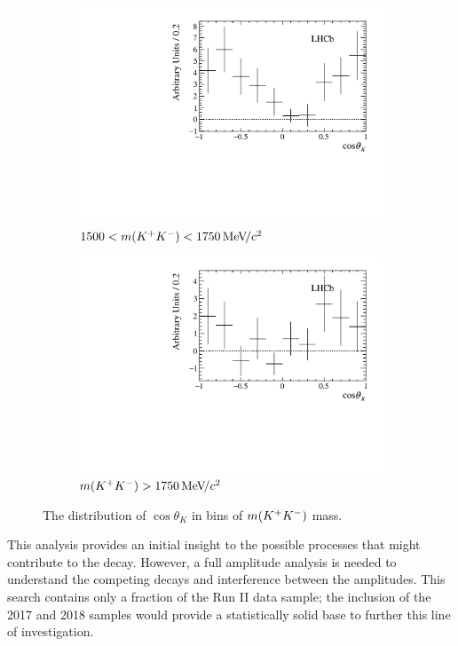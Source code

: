 \begin{figure}[!h]
\begin{subfigure}[t]{0.49\textwidth}
        \includegraphics[width=1.0\textwidth]{figs/B2DsKK/helAngle_bin3_sweighted.pdf}
        \caption{$1500<m({{K}^+}{{K}^-})<1750{\mathrm{\,Me\kern -0.1em V\!/}c^2}$}
    \end{subfigure}
    \begin{subfigure}[t]{0.49\textwidth}
        \includegraphics[width=1.0\textwidth]{figs/B2DsKK/helAngle_bin4_sweighted.pdf}
        \caption{$m({{K}^+}{{K}^-})>1750{\mathrm{\,Me\kern -0.1em V\!/}c^2}$}
    \end{subfigure}
    \caption{The distribution of $\cos{\theta_{K}}$ in bins of $m({{K}^+}{{K}^-})$ mass.}
    \label{fig:B2DsKK_helicty_angle_bins}
\end{figure}


This analysis provides an initial insight to the possible processes that might contribute to the \decay{\Bp}{\Dsp\Kp\Km} decay. However, a full amplitude analysis is needed to understand the competing decays and interference between the amplitudes. This search contains only a fraction of the Run II data sample; the inclusion of the 2017 and 2018 samples would provide a statistically solid base to further this line of investigation. 


